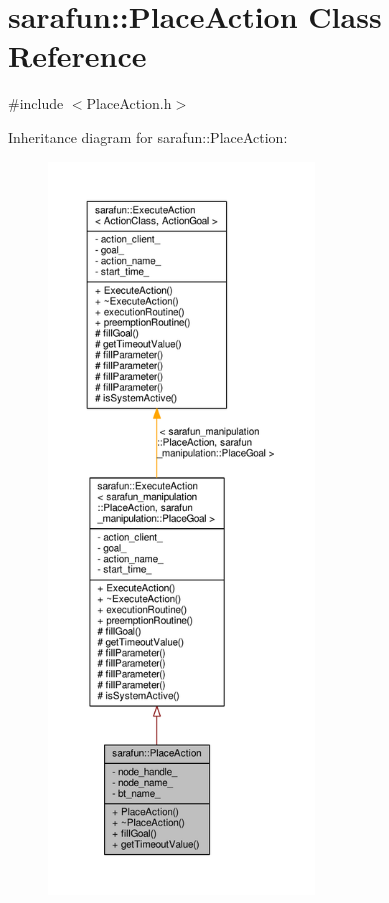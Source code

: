 \hypertarget{classsarafun_1_1PlaceAction}{\section{sarafun\-:\-:Place\-Action Class Reference}
\label{classsarafun_1_1PlaceAction}
}


{\ttfamily \#include $<$Place\-Action.\-h$>$}



Inheritance diagram for sarafun\-:\-:Place\-Action\-:
\nopagebreak
\begin{figure}[H]
\begin{center}
\leavevmode
\includegraphics[height=550pt]{dd/d57/classsarafun_1_1PlaceAction__inherit__graph}
\end{center}
\end{figure}


